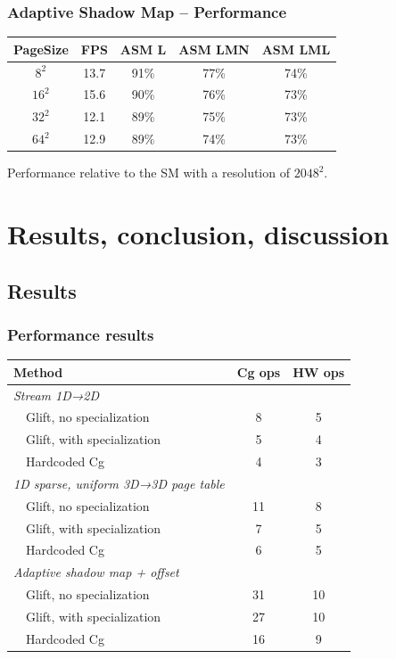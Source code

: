 \documentclass[xcolor={usenames,dvipsnames}]{beamer}
\begin{document}
\begin{frame}
  \frametitle{Adaptive Shadow Map -- Performance}
  \begin{center}
    \begin{tabular}{c c c c c}
      PageSize & FPS & ASM L & ASM LMN & ASM LML \\\hline
      $8^2$ & 13.7 & 91\% & 77\% & 74\% \\
      $16^2$ & 15.6 & 90\% & 76\% & 73\% \\
      $32^2$ & 12.1 & 89\% & 75\% & 73\% \\
      $64^2$ & 12.9 & 89\% & 74\% & 73\% \\
    \end{tabular} \vspace{9mm}

    Performance relative to the SM with a resolution of $2048^2$.
  \end{center}
\end{frame}

\section{Results, conclusion, discussion}
\subsection{Results}
\begin{frame}
  \frametitle{Performance results}
  \begin{tabular}{l c c}
    Method & Cg ops & HW ops \\\hline
    \emph{Stream 1D→2D} &&\\
    ~~Glift, no specialization & 8 & 5 \\
    ~~Glift, with specialization & 5 & 4 \\
    ~~Hardcoded Cg & 4 & 3\\
    \emph{1D sparse, uniform 3D→3D page table} &&\\
    ~~Glift, no specialization & 11 & 8 \\
    ~~Glift, with specialization & 7 & 5 \\
    ~~Hardcoded Cg & 6 & 5\\
    \emph{Adaptive shadow map + offset} &&\\
    ~~Glift, no specialization & 31 & 10 \\
    ~~Glift, with specialization & 27 & 10 \\
    ~~Hardcoded Cg & 16 & 9\\
  \end{tabular}
\end{frame}
\end{document}
